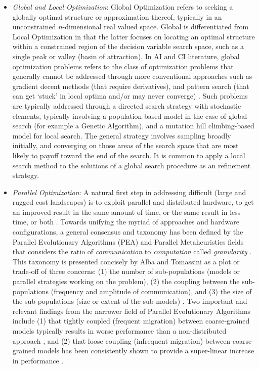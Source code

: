 \documentclass[a4paper, 11pt]{article}
\begin{document}
\begin{itemize}
	
	\item \emph{Global and Local Optimization}: Global Optimization refers to seeking a globally optimal structure or approximation thereof, typically in an unconstrained $n$-dimensional real valued space. Global is differentiated from Local Optimization in that the latter focuses on locating an optimal structure within a constrained region of the decision variable search space, such as a single peak or valley (basin of attraction). In AI and CI literature, global optimization problems refers to the class of optimization problems that generally cannot be addressed through more conventional approaches such as gradient decent methods (that require derivatives), and pattern search (that can get `stuck' in local optima and/or may never converge) \cite{Price1977, Toern1999}. Such problems are typically addressed through a directed search strategy with stochastic elements, typically involving a population-based model in the case of global search (for example a Genetic Algorithm), and a mutation hill climbing-based model for local search. The general strategy involves sampling broadly initially, and converging on those areas of the search space that are most likely to payoff toward the end of the search. It is common to apply a local search method to the solutions of a global search procedure as an refinement strategy.
	
	\item \emph{Parallel Optimization}: A natural first step in addressing difficult (large and rugged cost landscapes) is to exploit parallel and distributed hardware, to get an improved result in the same amount of time, or the same result in less time, or both \cite{Crainic2005}. Towards unifying the myriad of approaches and hardware configurations, a general consensus and taxonomy has been defined by the Parallel Evolutionary Algorithms (PEA) and Parallel Metaheuristics fields that considers the ratio of \emph{communication} to \emph{computation} called \emph{granularity} \cite{Cantu-Paz2000, Alba2005a}. This taxonomy is presented concisely by Alba and Tomassini as a plot or trade-off of three concerns: (1) the number of sub-populations (models or parallel strategies working on the problem), (2) the coupling between the sub-populations (frequency and amplitude of communication), and (3) the size of the sub-populations (size or extent of the sub-models) \cite{Alba2002}. Two important and relevant findings from the narrower field of Parallel Evolutionary Algorithms include (1) that tightly coupled (frequent migration) between coarse-grained models typically results in worse performance than a non-distributed approach \cite{Alba2000}, and (2) that loose coupling (infrequent migration) between coarse-grained models has been consistently shown to provide a super-linear increase in performance \cite{Alba2002a, Belding1995, Cantu-Paz2000}.
	

\end{itemize}
\end{document}

